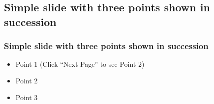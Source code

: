 \documentclass[]{beamer}
\begin{document}
\begin{frame}

\end{frame}

\begin{frame}

\end{frame}

\begin{frame}

\end{frame}


\begin{frame}

\end{frame}

\subsection{Simple slide with three points shown in succession}

\begin{frame}
  \frametitle{Simple slide with three points shown in succession}   %

  \begin{itemize}
  \item<1-> Point 1 (Click ``Next Page'' to see Point 2) %
  \item<2-> Point 2  %
  \item<3-> Point 3
  \end{itemize}
\end{frame}
\end{document}
